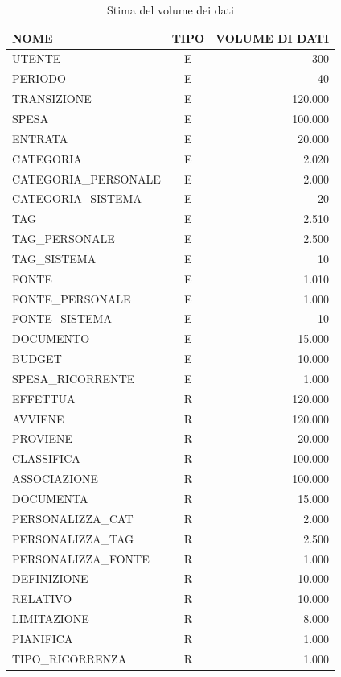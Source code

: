 \documentclass[11pt,a4paper]{article}
\begin{document}
\begin{table}[H]
\centering
\caption{Stima del volume dei dati}\label{tab:volumi-dati}
\scriptsize
\renewcommand{\arraystretch}{1.02}
\setlength{\tabcolsep}{5pt}
\begin{tabular}{|>{\raggedright\arraybackslash}p{8.2cm}|c|r|}
\hline
\rowcolor{tableheader}
\textbf{NOME} & \textbf{TIPO} & \textbf{VOLUME DI DATI} \\
\hline
\textsc{UTENTE} & E & 300 \\
\hline
\textsc{PERIODO} & E & 40 \\
\hline
\textsc{TRANSIZIONE} & E & 120.000 \\
\hline
\textsc{SPESA} & E & 100.000 \\
\hline
\textsc{ENTRATA} & E & 20.000 \\
\hline
\textsc{CATEGORIA} & E & 2.020 \\
\hline
\textsc{CATEGORIA\_PERSONALE} & E & 2.000 \\
\hline
\textsc{CATEGORIA\_SISTEMA} & E & 20 \\
\hline
\textsc{TAG} & E & 2.510 \\
\hline
\textsc{TAG\_PERSONALE} & E & 2.500 \\
\hline
\textsc{TAG\_SISTEMA} & E & 10 \\
\hline
\textsc{FONTE} & E & 1.010 \\
\hline
\textsc{FONTE\_PERSONALE} & E & 1.000 \\
\hline
\textsc{FONTE\_SISTEMA} & E & 10 \\
\hline
\textsc{DOCUMENTO} & E & 15.000 \\
\hline
\textsc{BUDGET} & E & 10.000 \\
\hline
\textsc{SPESA\_RICORRENTE} & E & 1.000 \\
\hline
\textsc{EFFETTUA} & R & 120.000 \\
\hline
\textsc{AVVIENE} & R & 120.000 \\
\hline
\textsc{PROVIENE} & R & 20.000 \\
\hline
\textsc{CLASSIFICA} & R & 100.000 \\
\hline
\textsc{ASSOCIAZIONE} & R & 100.000 \\
\hline
\textsc{DOCUMENTA} & R & 15.000 \\
\hline
\textsc{PERSONALIZZA\_CAT} & R & 2.000 \\
\hline
\textsc{PERSONALIZZA\_TAG} & R & 2.500 \\
\hline
\textsc{PERSONALIZZA\_FONTE} & R & 1.000 \\
\hline
\textsc{DEFINIZIONE} & R & 10.000 \\
\hline
\textsc{RELATIVO} & R & 10.000 \\
\hline
\textsc{LIMITAZIONE} & R & 8.000 \\
\hline
\textsc{PIANIFICA} & R & 1.000 \\
\hline
\textsc{TIPO\_RICORRENZA} & R & 1.000 \\
\hline
\end{tabular}
\end{table}
\end{document}
